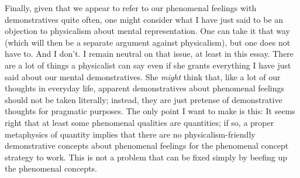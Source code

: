 \documentclass[a4paper,12pt]{article}
\begin{document}
Finally, given that we appear to refer to our phenomenal feelings with demonstratives quite often, one might consider what I have just said to be an objection to physicalism about mental representation. One can take it that way (which will then be a separate argument against physicalism), but one does not have to. And I don't. I remain neutral on that issue, at least in this essay. There are a lot of things a physicalist can say even if she grants everything I have just said about our mental demonstratives. She \emph{might} think that, like a lot of our thoughts in everyday life, apparent demonstratives about phenomenal feelings should not be taken literally; instead, they are just pretense of demonstrative thoughts for pragmatic purposes. The only point I want to make is this: It seems right that at least some phenomenal qualities are quantities; if so, a proper metaphysics of quantity implies that there are no physicalism-friendly demonstrative concepts about phenomenal feelings for the phenomenal concept strategy to work. This is not a problem that can be fixed simply by beefing up the phenomenal concepts.\footnotemark


\nocite{*}


\end{document}
